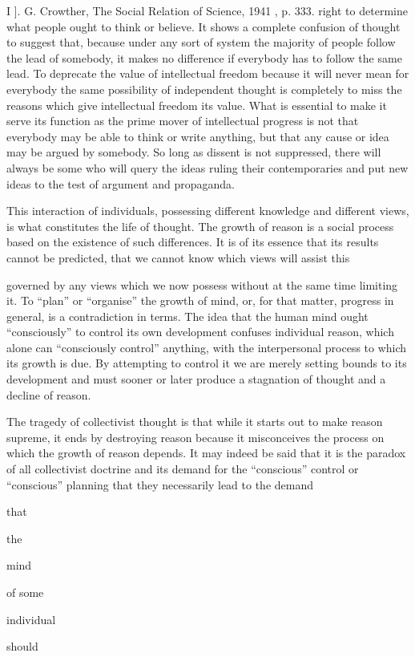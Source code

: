 \documentclass[11pt,openany]{book}
\begin{document}
I ]. G. Crowther, The Social Relation of Science, 1941 , p. 333. right to determine what people ought to think or believe. It shows a complete confusion of thought to suggest that, because under any sort of system the majority of people follow the lead of somebody, it makes no difference if everybody has to follow the same lead. To deprecate the value of intellectual freedom because it will never mean for everybody the same possibility of independent thought is completely to miss the reasons which give intellectual freedom its value. What is essential to make it serve its function as the prime mover of intellectual progress is not that everybody may be able to think or write anything, but that any cause or idea may be argued by somebody. So long as dissent is not suppressed, there will always be some who will query the ideas ruling their contemporaries and put new ideas to the test of argument and propaganda.

This interaction of individuals, possessing different knowledge and different views, is what constitutes the life of thought. The growth of reason is a social process based on the existence of such differences. It is of its essence that its results cannot be predicted, that we cannot know which views will assist this

governed by any views which we now possess without at the same time limiting it. To ``plan'' or ``organise'' the growth of mind, or, for that matter, progress in general, is a contradiction in terms. The idea that the human mind ought ``consciously'' to control its own development confuses individual reason, which alone can ``consciously control'' anything, with the interpersonal process to which its growth is due. By attempting to control it we are merely setting bounds to its development and must sooner or later produce a stagnation of thought and a decline of reason.

The tragedy of collectivist thought is that while it starts out to make reason supreme, it ends by destroying reason because it misconceives the process on which the growth of reason depends. It may indeed be said that it is the paradox of all collectivist doctrine and its demand for the ``conscious'' control or ``conscious'' planning that they necessarily lead to the demand

that

the

mind

of some

individual

should
\end{document}
